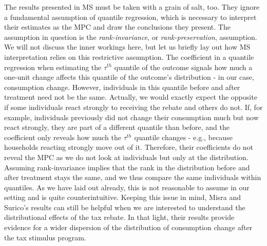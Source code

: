 The results presented in MS must be taken with a grain of salt, too. They ignore a fundamental assumption of quantile regression, which is necessary to interpret their estimates as the MPC and draw the conclusions they present. The assumption in question is the \textit{rank-invariance}, or \textit{rank-preservation}, assumption. We will not discuss the inner workings here, but let us briefly lay out how MS interpretation relies on this restrictive assumption. The coefficient in a quantile regression when estimating the $\tau^{th}$ quantile of the outcome signals how much a one-unit change affects this quantile of the outcome's distribution - in our case, consumption change. However, individuals in this quantile before and after treatment need not be the same. Actually, we would exactly expect the opposite if some individuals react strongly to receiving the rebate and others do not. If, for example, individuals previously did not change their consumption much but now react strongly, they are part of a different quantile than before, and the coefficient only reveals how much the $\tau^{th}$ quantile changes - e.g., because households reacting strongly move out of it. Therefore, their coefficients do not reveal the MPC as we do not look at individuals but only at the distribution. Assuming rank-invariance implies that the rank in the distribution before and after treatment stays the same, and we thus compare the same individuals within quantiles. As we have laid out already, this is not reasonable to assume in our setting and is quite counterintuitive. Keeping this issue in mind, Misra and Surico's results can still be helpful when we are interested to understand the distributional effects of the tax rebate. In that light, their results provide evidence for a wider dispersion of the distribution of consumption change after the tax stimulus program.